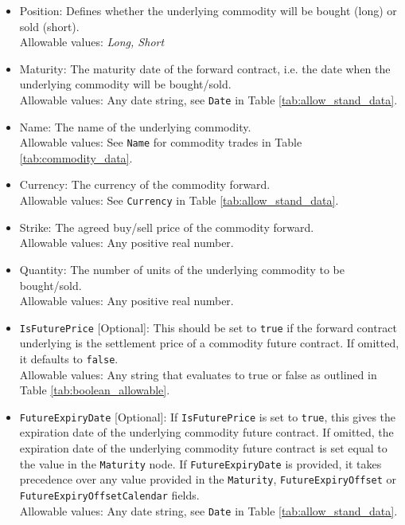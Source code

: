 \begin{itemize}
\item Position: Defines whether the underlying commodity will be bought (long) or sold (short). \\
Allowable values: \emph{Long, Short}

\item Maturity: The maturity date of the forward contract, i.e. the date when the underlying commodity will be bought/sold. \\
Allowable values: Any date string, see \lstinline!Date! in Table \ref{tab:allow_stand_data}.

\item Name: The name of the underlying commodity. \\
Allowable values:  See \lstinline!Name! for commodity trades in Table \ref{tab:commodity_data}. \\

\item Currency: The  currency of the commodity forward. \\
Allowable values:  See \lstinline!Currency! in Table \ref{tab:allow_stand_data}.	

\item Strike: The agreed buy/sell price of the commodity forward. \\
Allowable values:  Any positive real number.

\item Quantity: The number of units of the underlying commodity to be bought/sold. \\
Allowable values:  Any positive real number.

\item \lstinline!IsFuturePrice! [Optional]: This should be set to \lstinline!true! if the forward contract underlying is the settlement price of a commodity future contract. If omitted, it defaults to \lstinline!false!. \\
Allowable values: Any string that evaluates to true or false as outlined in Table \ref{tab:boolean_allowable}.

\item \lstinline!FutureExpiryDate! [Optional]: If \lstinline!IsFuturePrice! is set to \lstinline!true!, this gives the expiration date of the underlying commodity future contract. If omitted, the expiration date of the underlying commodity future contract is set equal to the value in the \lstinline!Maturity! node. If \lstinline!FutureExpiryDate! is provided, it takes precedence over any value provided in the \lstinline!Maturity!,  \lstinline!FutureExpiryOffset! or \lstinline!FutureExpiryOffsetCalendar! fields. \\
Allowable values: Any date string, see \lstinline!Date! in Table \ref{tab:allow_stand_data}.


\end{itemize}
